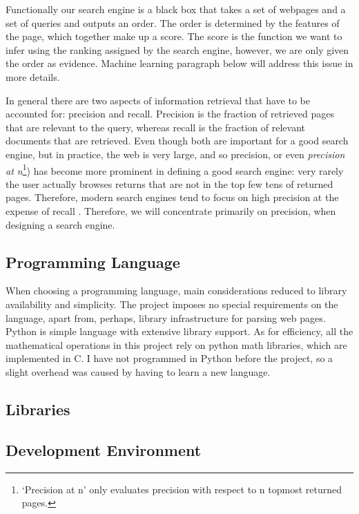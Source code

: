 \documentclass[12pt,notitlepage,twoside]{scrreprt}
\begin{document}
Functionally our search engine is a black box that takes a set of webpages and
a set of queries and outputs an order. The order is determined by the features
of the page, which together make up a score. The score is the
function we want to infer using the ranking assigned by the search engine,
however, we are only given the order as evidence. Machine learning paragraph
below will address this issue in more details.

In general there are two aspects of information retrieval that have to be
accounted for: precision and recall. Precision is the fraction of retrieved pages that
are relevant to the query, whereas recall is the fraction of relevant
documents that are retrieved. Even though both are important for a good search
engine, but in practice, the web is very large, and so precision, or even
\textit{precision at n}\footnote{`Precision at n' only evaluates precision with respect to
n topmost returned pages.}) has become
more prominent in defining a good search engine: very rarely the user actually
browses returns that are not in the top few tens of returned pages. Therefore, 
modern search engines tend to focus on high precision at the expense of recall
\cite{GOOGLE}. Therefore, we will concentrate primarily on precision, when
designing a search engine.


\subsection{Programming Language}

When choosing a programming language, main considerations reduced to library
availability and simplicity. The project imposes no special  requirements on the
language, apart from, perhaps, library infrastructure for parsing web pages.
Python is simple language with extensive library support. As
for efficiency, all the mathematical operations in this project rely on python
math libraries, which are implemented in C. I have not programmed in Python
before the project, so a slight overhead was caused by having to learn a new
language.

\subsection{Libraries}
\subsection{Development Environment}
\end{document}
